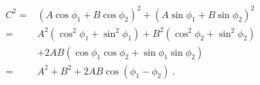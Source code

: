 \begin{equation}
\begin{aligned}
C^2
= & \left(A \cos \phi_1+B \cos \phi_2\right)^2+\left(A \sin \phi_1+B \sin \phi_2\right)^2 \\
= & A^2\left(\cos ^2 \phi_1+\sin ^2 \phi_1\right)+B^2\left(\cos ^2 \phi_2+\sin ^2 \phi_2\right) \\
& +2 A B\left(\cos \phi_1 \cos \phi_2+\sin \phi_1 \sin \phi_2\right) \\
= & A^2+B^2+2 A B \cos \left(\phi_1-\phi_2\right)~.
\end{aligned}
\end{equation}